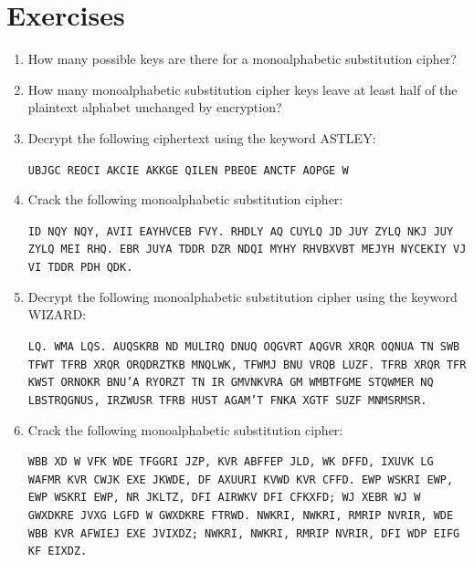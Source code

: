 \documentclass{book}
\theoremstyle{plain}
\theoremstyle{definition}
\newif\ifprintsolutions
\newcommand{\solution}[1]{\ifprintsolutions \begin{sloppypar}{\it #1}\end{sloppypar} \fi} %
\newcommand{\display}[1]{\begin{sloppypar}\setlength{\parindent}{0mm}#1\end{sloppypar}} %
\newcommand{\ciphertextspace}[1]{\begin{sloppypar}\doublespacing\Large\texttt{#1}\end{sloppypar}} %
\begin{document}
\section{Exercises}
\begin{enumerate}
\item How many possible keys are there for a monoalphabetic substitution cipher? \solution{There are $26! \approx 403$ septillion possible keys.}
\item How many monoalphabetic substitution cipher keys leave at least half of the plaintext alphabet unchanged by encryption? \solution{Choose the fixed letters in $\binom{26}{13}$ ways. The other letters can be rearranged in $13!$ ways. There are thus a total of $64764752532480000$ such keys.}
\item Decrypt the following ciphertext using the keyword ASTLEY:
\display{\ciphertextspace{UBJGC REOCI AKCIE AKKGE QILEN PBEOE ANCTF AOPGE W}} \solution{Who lives in a pineapple under the sea Rick Astley}
\item Crack the following monoalphabetic substitution cipher:
\display{\ciphertextspace{ID NQY NQY, AVII EAYHVCEB FVY. RHDLY AQ CUYLQ JD JUY ZYLQ NKJ JUY ZYLQ MEI RHQ. EBR JUYA TDDR DZR NDQI MYHY RHVBXVBT MEJYH NYCEKIY VJ VI TDDR PDH QDK.}} \solution{Keyword ENCRYPT: So bye bye, Miss American Pie. Drove my Chevy to the levy but the levy was dry. And them good old boys were drinking water because it is good for you.}
\item Decrypt the following monoalphabetic substitution cipher using the keyword WIZARD:
\display{\ciphertextspace{LQ. WMA LQS. AUQSKRB ND MULIRQ DNUQ OQGVRT AQGVR XRQR OQNUA TN SWB TFWT TFRB XRQR ORQDRZTKB MNQLWK, TFWMJ BNU VRQB LUZF. TFRB XRQR TFR KWST ORNOKR BNU'A RYORZT TN IR GMVNKVRA GM WMBTFGME STQWMER NQ LBSTRQGNUS, IRZWUSR TFRB HUST AGAM'T FNKA XGTF SUZF MNMSRMSR.}} \solution{Keyword WIZARD: Mr. and Mrs. Dursley of number four Privet Drive were proud to say that they were perfectly normal, thank you very much. They were the last people you'd expect to be involved in anything strange or mysterious, because they just didn't hold with such nonsense.}
\item Crack the following monoalphabetic substitution cipher:
\display{\ciphertextspace{WBB XD W VFK WDE TFGGRI JZP, KVR ABFFEP JLD, WK DFFD, IXUVK LG WAFMR KVR CWJK EXE JKWDE, DF AXUURI KVWD KVR CFFD. EWP WSKRI EWP, EWP WSKRI EWP, NR JKLTZ, DFI AIRWKV DFI CFKXFD; WJ XEBR WJ W GWXDKRE JVXG LGFD W GWXDKRE FTRWD. NWKRI, NWKRI, RMRIP NVRIR, WDE WBB KVR AFWIEJ EXE JVIXDZ; NWKRI, NWKRI, RMRIP NVRIR, DFI WDP EIFG KF EIXDZ.}} \solution{Keyword WATER: All in a hot and copper sky, the bloody sun, at noon, right up above the mast did stand, no bigger than the moon. Day after day, day after day, we stuck, nor breath nor motion; as idle as a painted ship upon a painted ocean. Water, water, every where, and all the boards did shrink; water, water, every where, nor any drop to drink.}

\end{enumerate}
\end{document}
